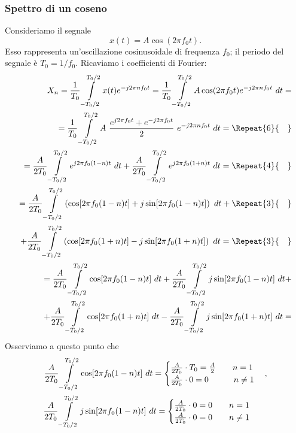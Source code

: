 \documentclass[12pt,oneside,openany]{memoir}
\numberwithin{equation}{subsection}
\newcommand{\quads}[1]{\Repeat{#1}{\quad}}
\newcommand{\dt}{\ dt}
\begin{document}
\subsubsection{Spettro di un coseno}
Consideriamo il segnale
\begin{equation}
	x(t) = A \cos(2 \pi f_0 t).
\end{equation}
Esso rappresenta un'oscillazione cosinusoidale di frequenza $f_0$; il periodo del segnale \`e $T_0 = 1/f_0$. Ricaviamo i coefficienti di Fourier:
\begin{equation}
	\begin{split}
		X_n = \frac{1}{T_0} \int\displaylimits_{-T_0/2}^{T_0/2} x(t) e^{-j 2 \pi n f_0 t} = \frac{1}{T_0} \int\displaylimits_{-T_0/2}^{T_0/2} A \cos(2 \pi f_0 t) e^{-j 2 \pi n f_0 t} \dt =
		\\
		= \frac{1}{T_0} \int\displaylimits_{-T_0/2}^{T_0/2} A \ \frac{e^{j 2 \pi f_0 t} + e^{-j 2 \pi f_0 t}}{2} \ e^{-j 2 \pi n f_0 t} \dt =
		\quads{6}
		\\
		= \frac{A}{2 T_0} \int\displaylimits_{-T_0/2}^{T_0/2} e^{j 2 \pi f_0 (1 - n) t} \dt + \frac{A}{2 T_0} \int\displaylimits_{-T_0/2}^{T_0/2} e^{j 2 \pi f_0 (1 + n) t} \dt =
		\quads{4}
		\\
		= \frac{A}{2 T_0} \int\displaylimits_{-T_0/2}^{T_0/2} \left( \cos[2 \pi f_0 (1 - n) t] + j \sin[2 \pi f_0 (1 - n) t] \right) \dt +
		\quads{3}
		\\
		+ \frac{A}{2 T_0} \int\displaylimits_{-T_0/2}^{T_0/2} \left( \cos[2 \pi f_0 (1 + n) t] - j \sin[2 \pi f_0 (1 + n) t] \right) \dt =
		\quads{3}
		\\
		= \frac{A}{2 T_0} \int\displaylimits_{-T_0/2}^{T_0/2} \cos[2 \pi f_0 (1 - n) t] \dt + \frac{A}{2 T_0} \int\displaylimits_{-T_0/2}^{T_0/2} j \sin[2 \pi f_0 (1 - n) t] \dt +
		\\
		+ \frac{A}{2 T_0} \int\displaylimits_{-T_0/2}^{T_0/2} \cos[2 \pi f_0 (1 + n) t] \dt - \frac{A}{2 T_0} \int\displaylimits_{-T_0/2}^{T_0/2} j \sin[2 \pi f_0 (1 + n) t] \dt =
	\end{split}
\end{equation}
Osserviamo a questo punto che
\begin{equation}
	\begin{split}
		\frac{A}{2 T_0} \int\displaylimits_{-T_0/2}^{T_0/2} \cos[2 \pi f_0 (1 - n) t] \dt =
			\begin{cases}
				\frac{A}{2 T_0} \cdot T_0 = \frac{A}{2} \quad\quad n = 1\\
				\frac{A}{2 T_0} \cdot 0 = 0 \quad\quad \ \ \ n \neq 1
			\end{cases},
		\\
		\frac{A}{2 T_0} \int\displaylimits_{-T_0/2}^{T_0/2} j \sin[2 \pi f_0 (1 - n) t] \dt =
			\begin{cases}
				\frac{A}{2 T_0} \cdot 0 = 0 \quad\quad n = 1\\
				\frac{A}{2 T_0} \cdot 0 = 0 \quad\quad n \neq 1
			\end{cases}
			\quad
	\end{split}
\end{equation}
\end{document}
